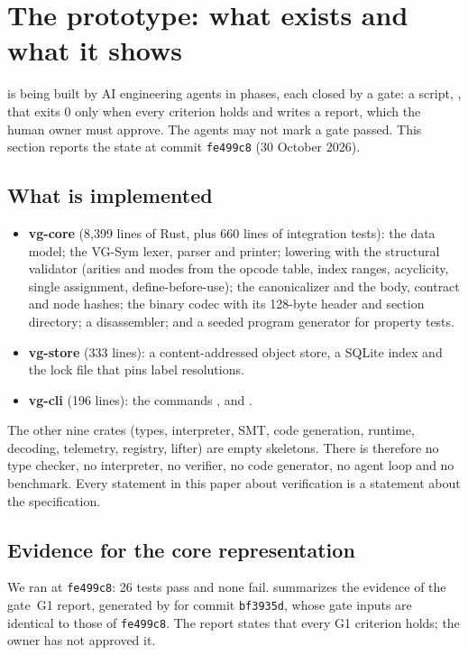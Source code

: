 \section{The prototype: what exists and what it shows}\label{sec:status}

\VG{} is being built by AI engineering agents in phases, each closed by a gate: a script,
, that exits $0$ only when every criterion holds and writes a report, which the
human owner must approve. The agents may not mark a gate passed. This section reports the state
at commit \texttt{fe499c8} (30 October 2026).

\subsection{What is implemented}

\begin{itemize}
\item \textbf{vg-core} (8,399 lines of Rust, plus 660 lines of integration tests): the data
  model; the VG-Sym lexer, parser and printer; lowering with the structural validator
  (arities and modes from the opcode table, index ranges, acyclicity, single assignment,
  define-before-use); the canonicalizer and the body, contract and node hashes; the binary
  codec with its 128-byte header and section directory; a disassembler; and a seeded program
  generator for property tests.
\item \textbf{vg-store} (333 lines): a content-addressed object store, a SQLite index and the
  lock file that pins label resolutions.
\item \textbf{vg-cli} (196 lines): the commands ,  and .
\end{itemize}
The other nine crates (types, interpreter, SMT, code generation, runtime, decoding, telemetry,
registry, lifter) are empty skeletons. There is therefore no type checker, no interpreter, no
verifier, no code generator, no agent loop and no benchmark. Every statement in this paper about
verification is a statement about the specification.

\subsection{Evidence for the core representation}

We ran  at \texttt{fe499c8}: 26 tests pass and none fail.
 summarizes the evidence of the gate~G1 report, generated by 
for commit \texttt{bf3935d}, whose gate inputs are identical to those of \texttt{fe499c8}. The
report states that every G1 criterion holds; the owner has not approved it.

